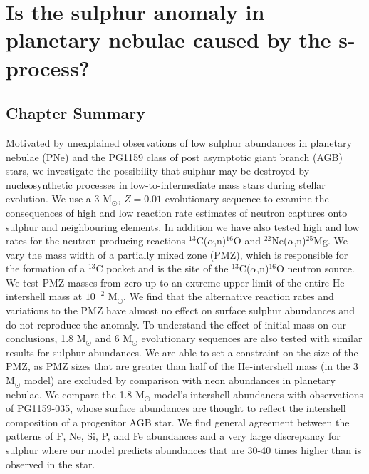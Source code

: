 \chapter{Is the sulphur anomaly in planetary nebulae caused by the s-process?}\label{chap:shingleskarakas2013}



\section{Chapter Summary}
Motivated by unexplained observations of low sulphur abundances in planetary nebulae (PNe) and the PG1159 class of post asymptotic giant branch (AGB) stars, we investigate the possibility that sulphur may be destroyed by nucleosynthetic processes in low-to-intermediate mass stars during stellar evolution. We use a 3 M$_\odot$, $Z=0.01$ evolutionary sequence to examine the consequences of high and low reaction rate estimates of neutron captures onto sulphur and neighbouring elements. In addition we have also tested high and low rates for the neutron producing reactions $^{13}$C($\alpha$,n)$^{16}$O and $^{22}$Ne($\alpha$,n)$^{25}$Mg. We vary the mass width of a partially mixed zone (PMZ), which is responsible for the formation of a $^{13}$C pocket and is the site of the $^{13}$C($\alpha$,n)$^{16}$O neutron source. We test PMZ masses from zero up to an extreme upper limit of the entire He-intershell mass at $10^{-2}$ M$_\odot$. We find that the alternative reaction rates and variations to the PMZ have almost no effect on surface sulphur abundances and do not reproduce the anomaly. To understand the effect of initial mass on our conclusions, 1.8 M$_\odot$ and 6 M$_\odot$ evolutionary sequences are also tested with similar results for sulphur abundances. We are able to set a constraint on the size of the PMZ, as PMZ sizes that are greater than half of the He-intershell mass (in the 3 M$_\odot$ model) are excluded by comparison with neon abundances in planetary nebulae. We compare the 1.8 M$_\odot$ model's intershell abundances with observations of PG1159-035, whose surface abundances are thought to reflect the intershell composition of a progenitor AGB star. We find general agreement between the patterns of F, Ne, Si, P, and Fe abundances and a very large discrepancy for sulphur where our model predicts abundances that are 30-40 times higher than is observed in the star.

